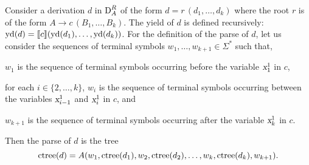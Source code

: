 \documentclass[../document.tex]{subfiles}
\begin{document}
    \begin{definition}
        Consider a derivation \(d\) in \(\operatorname{D}^R_A\) of the form \(d = r\,(d_1, \ldots, d_k)\) where the root \(r\) is of the form \(A \to c\,(B_1, \ldots, B_k)\).
        The yield of \(d\) is defined recursively: \(\operatorname{yd}(d) = \llbracket c\rrbracket(\operatorname{yd}(d_1), \ldots, \operatorname{yd}(d_k))\).
        For the definition of the parse of \(d\), let us consider the sequences of terminal symbols \(w_1, \ldots, w_{k+1} \in \varSigma^*\) such that,
        \begin{compactitem}
            \item \(w_1\) is the sequence of terminal symbols occurring before the variable \(\textsl{x}_1^1\) in \(c\),
            \item for each \(i \in \{2, \ldots, k\}\), \(w_i\) is the sequence of terminal symbols occurring between the variables \(\textsl{x}_{i-1}^1\) and \(\textsl{x}_i^1\) in \(c\), and
            \item \(w_{k+1}\) is the sequence of terminal symbols occurring after the variable \(\textsl{x}_k^1\) in \(c\).
        \end{compactitem}
        Then the parse of \(d\) is the tree \[
            \operatorname{ctree}(d) = A(w_1, \operatorname{ctree}(d_1), w_2, \operatorname{ctree}(d_2), \ldots, w_k, \operatorname{ctree}(d_k), w_{k+1}) \text{.}
        \]
    \end{definition}
\end{document}
